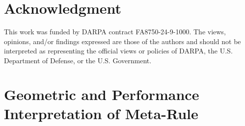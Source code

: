\documentclass[conference]{IEEEtran}
\begin{document}




\section*{Acknowledgment}
This work was funded by DARPA contract FA8750-24-9-1000. The views, opinions, and/or findings expressed are those of the authors and should not be interpreted as representing the official views or policies of DARPA, the U.S. Department of Defense, or the U.S. Government. 

\iffalse
\appendices

\section{Geometric and Performance Interpretation of Meta-Rule }
\label{app:vsc}
\end{document}
